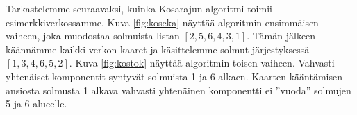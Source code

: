 Tarkastelemme seuraavaksi, kuinka Kosarajun algoritmi
toimii esimerkkiverkossamme.
Kuva \ref{fig:koseka} näyttää algoritmin ensimmäisen vaiheen,
joka muodostaa solmuista listan $[2,5,6,4,3,1]$.
Tämän jälkeen käännämme kaikki verkon kaaret ja
käsittelemme solmut järjestyksessä $[1,3,4,6,5,2]$.
Kuva \ref{fig:kostok} näyttää algoritmin toisen vaiheen.
Vahvasti yhtenäiset komponentit syntyvät
solmuista 1 ja 6 alkaen.
Kaarten kääntämisen ansiosta
solmusta 1 alkava
vahvasti yhtenäinen komponentti ei ''vuoda''
solmujen 5 ja 6 alueelle.

\begin{figure}
\center
\begin{center}
\end{center}
\end{figure}
